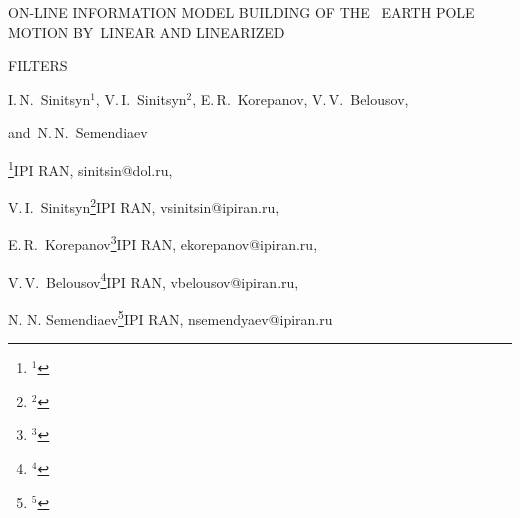 \def\vrp{\varphi}


\def\la{\lambda}


\def\alp{\alpha}


\def\w{\omega}


\def\W{\Omega}


\def\sssd{\mathop{\sum\limits^2\sum\limits^2}}


\def\sssn{\mathop{\sum\limits^n\sum\limits^n}}


\def\liminf{\mathop{\cup\,inf}} \def\limsup{\mathop{\cup\,sup}}


\def\iint{\int\limits_{-\infty}^{\infty}}


\def\iii{\int\limits}


\def\sss{\sum\limits}


\def\prt{\partial}


\def\mm{{\rm M}}






















ON-LINE INFORMATION MODEL BUILDING OF THE~ EARTH POLE MOTION BY~LINEAR AND LINEARIZED


FILTERS








I.\,N.~Sinitsyn$^1$, V.\,I.~Sinitsyn$^2$, E.\,R.~Korepanov, V.\,V.~Belousov, 


and~N.\,N.~Semendiaev


\footnote{$^1$}{\sevenrm IPI RAN, sinitsin@dol.ru},


V.\,I.~Sinitsyn\footnote{$^2$}{\sevenrm IPI RAN, vsinitsin@ipiran.ru},


E.\,R.~Korepanov\footnote{$^3$}{\sevenrm IPI RAN, ekorepanov@ipiran.ru},


V.\,V.~Belousov\footnote{$^4$}{\sevenrm IPI RAN, vbelousov@ipiran.ru},


N. N. Semendiaev\footnote{$^5$}{\sevenrm IPI RAN, nsemendyaev@ipiran.ru}





\bigskip


